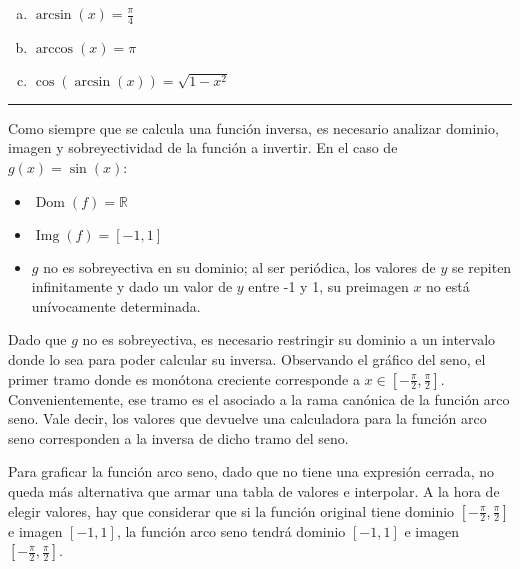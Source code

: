 \documentclass{article}
\begin{document}
\begin{enumerate}[(a)]

\bfseries

\item $ \arcsin(x) = \frac{\pi}{4} $

\item $ \arccos(x) = \pi $

\item $ \cos( \arcsin(x) ) = \sqrt{1 - x^2} $

\end{enumerate}

\hrule
\vspace{1em}

Como siempre que se calcula una función inversa, es necesario analizar dominio, imagen y sobreyectividad de la función a invertir. En el caso de $ g(x) = \sin(x) $:

\begin{itemize}

\item $ \mathop{\text{Dom}}(f) = \mathbb{R} $

\item $ \mathop{\text{Img}}(f) = [-1, 1] $

\item $ g $ no es sobreyectiva en su dominio; al ser periódica, los valores de $ y $ se repiten infinitamente y dado un valor de $y$ entre -1 y 1, su preimagen $x$ no está unívocamente determinada.

\end{itemize}

Dado que $ g $ no es sobreyectiva, es necesario restringir su dominio a un intervalo donde lo sea para poder calcular su inversa. Observando el gráfico del seno, el primer tramo donde es monótona creciente corresponde a $ x \in \left[-\frac{\pi}{2}, \frac{\pi}{2} \right] $. Convenientemente, ese tramo es el asociado a la rama canónica de la función arco seno. Vale decir, los valores que devuelve una calculadora para la función arco seno corresponden a la inversa de dicho tramo del seno.

Para graficar la función arco seno, dado que no tiene una expresión cerrada, no queda más alternativa que armar una tabla de valores e interpolar. A la hora de elegir valores, hay que considerar que si la función original tiene dominio $ \left[-\frac{\pi}{2}, \frac{\pi}{2} \right] $ e imagen $[-1, 1]$, la función arco seno tendrá dominio $[-1, 1]$ e imagen $ \left[-\frac{\pi}{2}, \frac{\pi}{2} \right] $.
\end{document}
